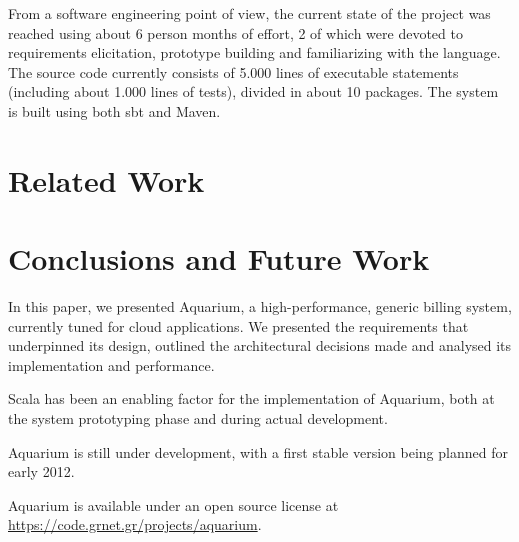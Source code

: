 \documentclass[preprint,10pt]{sigplanconf}
\begin{document}
From a software engineering point of view, the current state of the project was
reached using about 6 person months of effort, 2 of which were devoted to
requirements elicitation, prototype building and familiarizing with the
language. The source code currently consists of 5.000 lines of executable
statements (including about 1.000 lines of tests), divided in about 10
packages. The system is built using both {\sc sbt} and Maven. 

\section{Related Work}

\section{Conclusions and Future Work}
In this paper, we presented Aquarium, a high-performance, generic billing 
system, currently tuned for cloud applications. We presented the requirements
that underpinned its design, outlined the architectural decisions made
and analysed its implementation and performance.

Scala has been an enabling factor for the implementation of Aquarium, both
at the system prototyping phase and during actual development. 

Aquarium is still under development, with a first stable version 
being planned for early 2012. 

Aquarium is available under an open source license at 
\url{https://code.grnet.gr/projects/aquarium}.



\end{document}
